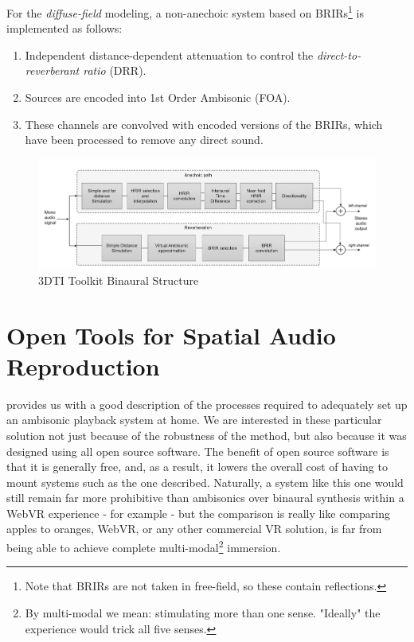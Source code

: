 For the \textit{diffuse-field} modeling, a non-anechoic system based on BRIRs\footnote{Note that BRIRs are not taken in free-field, so these contain reflections.} is implemented as follows:

\begin{enumerate}
    \item Independent distance-dependent attenuation to control the \textit{direct-to-reverberant ratio} (DRR). 
    \item Sources are encoded into 1st Order Ambisonic (FOA).
    \item These channels are convolved with encoded versions of the BRIRs, which have been processed to remove any direct sound.
\end{enumerate}

\begin{figure}[ht!]%
\centering
\includegraphics[width=1.0\textwidth]{img/3dti-chain.png} 
\caption{3DTI Toolkit Binaural Structure \cite{cuevas20193d}}
\label{fig:3dti-chain}
\end{figure}


\section{Open Tools for Spatial Audio Reproduction}


\cite{nettingsmeier2008ambi} provides us with a good description of the processes required to adequately set up an ambisonic playback system at home. We are interested in these particular solution not just because of the robustness of the method, but also because it was designed using all open source software. The benefit of open source software is that it is generally free, and, as a result, it lowers the overall cost of having to mount systems such as the one described. Naturally, a system like this one would still remain far more prohibitive than ambisonics over binaural synthesis within a WebVR experience - for example - but the comparison is really like comparing apples to oranges, WebVR, or any other commercial VR solution, is far from being able to achieve complete multi-modal\footnote{By multi-modal we mean: stimulating more than one sense. "Ideally" the experience would trick all five senses.} immersion.

